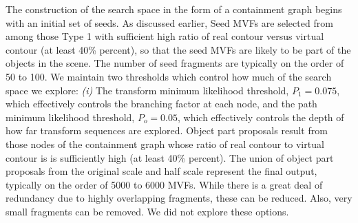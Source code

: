 The construction of the search space in the form of a containment graph begins with an initial set of seeds. As discussed earlier, Seed MVFs are selected from among those Type 1 with sufficient high ratio of real contour versus virtual contour (at least 40\% percent), so that the seed MVFs are likely to be part of the objects in the scene. The number of seed fragments are typically on the order of 50 to 100. We maintain two thresholds which control how much of the search space we explore: \emph{(i)} The transform minimum likelihood threshold, $P_1=0.075$, which effectively controls the branching factor at each node, and the path minimum likelihood threshold, $P_o=0.05$, which effectively controls the depth of how far transform sequences are explored. Object part proposals result from those nodes of the containment graph whose ratio of real contour to virtual contour is is sufficiently high (at least 40\% percent). The union of object part proposals from the original scale and half scale represent the final output, typically on the order of 5000 to 6000 MVFs. While there is a great deal of redundancy due to highly overlapping fragments, these can be reduced. Also, very small fragments can be removed. We did not explore these options.

